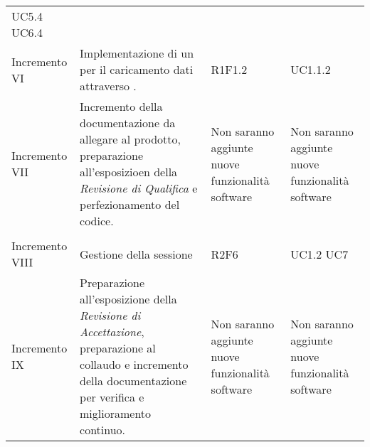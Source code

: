 \begin{longtable}{C{3cm} C{7cm} C{2cm} C{2cm}}
UC5.4 \newline UC6.4\\
Incremento VI & 
Implementazione di un  per il caricamento dati attraverso . & 
R1F1.2 & 
UC1.1.2\\
Incremento VII &
Incremento della documentazione da allegare al prodotto, preparazione all'esposizioen della \textit{Revisione di Qualifica} e perfezionamento del codice.& 
Non saranno aggiunte nuove funzionalità software & 
Non saranno aggiunte nuove funzionalità software\\
\\
Incremento VIII & 
Gestione della sessione & 
R2F6 & 
UC1.2 \newline UC7\\
Incremento IX & 
Preparazione all'esposizione della \textit{Revisione di Accettazione}, preparazione al collaudo e incremento della documentazione per verifica e miglioramento continuo.& 
Non saranno aggiunte nuove funzionalità software & 
Non saranno aggiunte nuove funzionalità software\\

\end{longtable}
